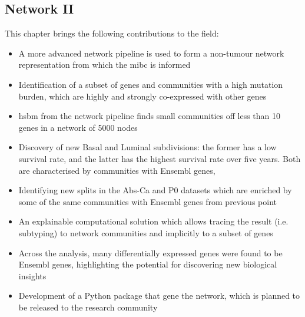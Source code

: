 \subsection*{Network II}

This chapter brings the following contributions to the field:
\begin{itemize}
    \item A more advanced network pipeline is used to form a non-tumour network representation from which the \acrshort{mibc} is informed
    \item Identification of a subset of genes and communities with a high mutation burden, which are highly and strongly co-expressed with other genes
    \item \acrfull{hsbm} from the network pipeline finds small communities off less than 10 genes in a network of 5000 nodes
    \item Discovery of new Basal and Luminal subdivisions: the former has a low survival rate, and the latter has the highest survival rate over five years. Both are characterised by communities with Ensembl genes,
    \item Identifying new splits in the Abs-Ca and P0 datasets which are enriched by some of the same communities with Ensembl genes from previous point 
    \item An explainable computational solution which allows tracing the result (i.e. subtyping) to network communities and implicitly to a subset of genes
    \item Across the analysis, many differentially expressed genes were found to be Ensembl genes, highlighting the potential for discovering new biological insights
    \item Development of a Python package that gene the network, which is planned to be released to the research community
\end{itemize}